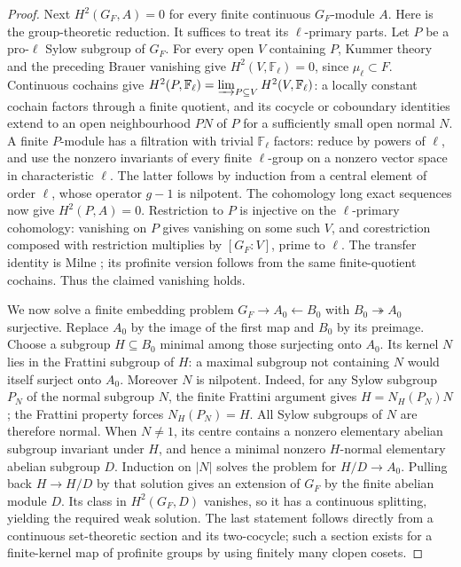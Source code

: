 \documentclass[11pt,a4paper]{article}
\begin{document}
\begin{proof}
Next $H^2(G_F,A)=0$ for every finite continuous $G_F$-module $A$.
Here is the group-theoretic reduction.  It suffices to treat its
$\ell$-primary parts.  Let $P$ be a pro-$\ell$ Sylow subgroup of $G_F$.
For every open $V$ containing $P$, Kummer theory and the preceding
Brauer vanishing give $H^2(V,\mathbb F_\ell)=0$, since $\mu_\ell\subset F$.
Continuous cochains give
$H^2(P,\mathbb F_\ell)=\varinjlim_{P\subseteq V}H^2(V,\mathbb F_\ell)$:
a locally constant cochain factors through a finite quotient, and its
cocycle or coboundary identities extend to an open neighbourhood $PN$ of
$P$ for a sufficiently small open normal $N$.  A finite $P$-module has a
filtration with trivial $\mathbb F_\ell$ factors: reduce by powers of
$\ell$, and use the nonzero invariants of every finite $\ell$-group on a
nonzero vector space in characteristic $\ell$.  The latter follows by
induction from a central element of order $\ell$, whose operator $g-1$
is nilpotent.  The cohomology long exact sequences now give
$H^2(P,A)=0$.  Restriction to $P$ is injective on the $\ell$-primary
cohomology: vanishing on $P$ gives vanishing on some such $V$, and
corestriction composed with restriction multiplies by $[G_F:V]$, prime
to $\ell$.  The transfer identity is Milne
\cite[II, Proposition 1.30]{D_MilneCFT}; its profinite version follows
from the same finite-quotient cochains.  Thus the claimed vanishing holds.

We now solve a finite embedding problem $G_F\to A_0\leftarrow B_0$
with $B_0\twoheadrightarrow A_0$ surjective.  Replace $A_0$ by the
image of the first map and $B_0$ by its preimage.  Choose a subgroup
$H\subseteq B_0$ minimal among those surjecting onto $A_0$.  Its kernel
$N$ lies in the Frattini subgroup of $H$: a maximal subgroup not
containing $N$ would itself surject onto $A_0$.  Moreover $N$ is
nilpotent.  Indeed, for any Sylow subgroup $P_N$ of the normal subgroup
$N$, the finite Frattini argument gives
$H=N_H(P_N)N$; the Frattini property forces $N_H(P_N)=H$.
All Sylow subgroups of $N$ are therefore normal.  When $N\ne1$, its
centre contains a nonzero elementary abelian subgroup invariant under
$H$, and hence a minimal nonzero $H$-normal elementary abelian subgroup
$D$.  Induction on $|N|$ solves the problem for $H/D\to A_0$.
Pulling back $H\to H/D$ by that solution gives an extension of $G_F$
by the finite abelian module $D$.  Its class in $H^2(G_F,D)$ vanishes,
so it has a continuous splitting, yielding the required weak solution.
The last statement follows directly from a continuous set-theoretic
section and its two-cocycle; such a section exists for a finite-kernel
map of profinite groups by using finitely many clopen cosets.


\end{proof}
\end{document}
